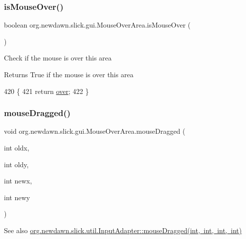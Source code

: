 \subsubsection{\texorpdfstring{is\+Mouse\+Over()}{isMouseOver()}}
{\footnotesize\ttfamily boolean org.\+newdawn.\+slick.\+gui.\+Mouse\+Over\+Area.\+is\+Mouse\+Over (\begin{DoxyParamCaption}{ }\end{DoxyParamCaption})\hspace{0.3cm}{\ttfamily [inline]}}

Check if the mouse is over this area

\begin{DoxyReturn}{Returns}
True if the mouse is over this area 
\end{DoxyReturn}

\begin{DoxyCode}
420                                  \{
421         \textcolor{keywordflow}{return} \mbox{\hyperlink{classorg_1_1newdawn_1_1slick_1_1gui_1_1_mouse_over_area_ac71b080e2b87f755f6e0fb54983877b1}{over}};
422     \}
\end{DoxyCode}
\mbox{\label{classorg_1_1newdawn_1_1slick_1_1gui_1_1_mouse_over_area_a425742d2c0b0bd51f4eee03b5b0083ba}} 
\subsubsection{\texorpdfstring{mouse\+Dragged()}{mouseDragged()}}
{\footnotesize\ttfamily void org.\+newdawn.\+slick.\+gui.\+Mouse\+Over\+Area.\+mouse\+Dragged (\begin{DoxyParamCaption}\item[{int}]{oldx,  }\item[{int}]{oldy,  }\item[{int}]{newx,  }\item[{int}]{newy }\end{DoxyParamCaption})\hspace{0.3cm}{\ttfamily [inline]}}

\begin{DoxySeeAlso}{See also}
\mbox{\hyperlink{classorg_1_1newdawn_1_1slick_1_1util_1_1_input_adapter_a185b6e79c736d75fb3dd7319ff1d147a}{org.\+newdawn.\+slick.\+util.\+Input\+Adapter\+::mouse\+Dragged(int, int, int, int)}} 
\end{DoxySeeAlso}


